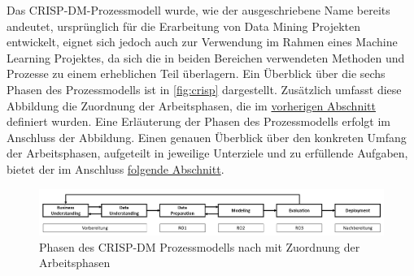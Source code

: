 Das CRISP-DM-Prozessmodell wurde, wie der ausgeschriebene Name bereits andeutet, ursprünglich für die Erarbeitung von Data Mining Projekten entwickelt, eignet sich jedoch auch zur Verwendung im Rahmen eines Machine Learning Projektes, da sich die in beiden Bereichen verwendeten Methoden und Prozesse zu einem erheblichen Teil überlagern. Ein Überblick über die sechs Phasen des Prozessmodells ist in \autoref{fig:crisp} dargestellt. Zusätzlich umfasst diese Abbildung die Zuordnung der Arbeitsphasen, die im \hyperref[phases_definition]{vorherigen Abschnitt} definiert wurden. Eine Erläuterung der Phasen des Prozessmodells erfolgt im Anschluss der Abbildung. Einen genauen Überblick über den konkreten Umfang der Arbeitsphasen, aufgeteilt in jeweilige Unterziele und zu erfüllende Aufgaben, bietet der im Anschluss \hyperref[timecourse] {folgende Abschnitt}. 

\begin{figure}[t]
    \centering
    \includegraphics[width=\textwidth]{images/CRISP-DM}
    \caption{Phasen des CRISP-DM Prozessmodells nach \cite{Chapman2000} mit Zuordnung der Arbeitsphasen}\label{fig:crisp}
\end{figure}

